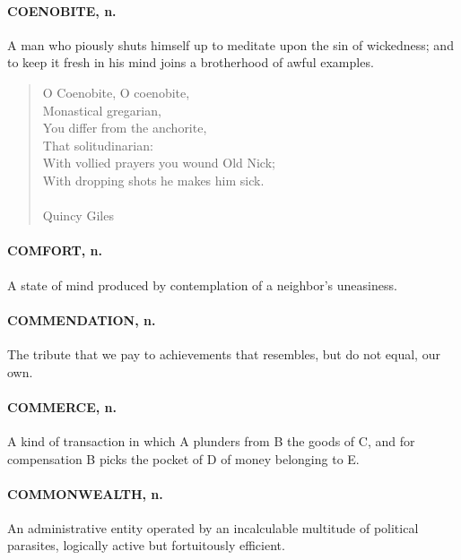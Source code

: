 \documentclass[11pt]{article}
\begin{document}
\paragraph{COENOBITE, n.}  A man who piously shuts himself up to meditate upon the
sin of wickedness; and to keep it fresh in his mind joins a
brotherhood of awful examples.

\begin{quote}   O Coenobite, O coenobite, \\
      Monastical gregarian, \\
  You differ from the anchorite, \\
      That solitudinarian: \\
  With vollied prayers you wound Old Nick; \\
  With dropping shots he makes him sick. \\
 \\
Quincy Giles \end{quote}


\paragraph{COMFORT, n.}  A state of mind produced by contemplation of a neighbor's
uneasiness.

\paragraph{COMMENDATION, n.}  The tribute that we pay to achievements that
resembles, but do not equal, our own.

\paragraph{COMMERCE, n.}  A kind of transaction in which A plunders from B the
goods of C, and for compensation B picks the pocket of D of money
belonging to E.

\paragraph{COMMONWEALTH, n.}  An administrative entity operated by an incalculable
multitude of political parasites, logically active but fortuitously
efficient.
\end{document}
